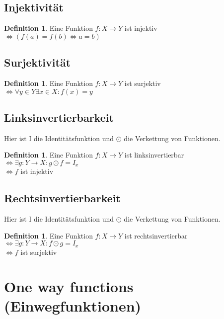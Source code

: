 \documentclass[12pt,a4paper]{article}
\theoremstyle{definition}
\newtheorem{definition}[theorem]{Definition}
\begin{document}
    \subsection{Injektivität}

    \begin{definition}
        Eine Funktion $f: X \longrightarrow Y$ ist injektiv \\
        $\Leftrightarrow (f(a) = f(b) \Leftrightarrow a = b)$
    \end{definition}

    \subsection{Surjektivität}

    \begin{definition}
        Eine Funktion $f: X \longrightarrow Y$ ist surjektiv \\
        $\Leftrightarrow \forall y \in Y \exists x \in X: f(x) = y$
    \end{definition}

    \subsection{Linksinvertierbarkeit}
    Hier ist I die Identitätsfunktion und $\odot$ die Verkettung von Funktionen.
    \begin{definition}
        Eine Funktion $f: X \longrightarrow Y$ ist linksinvertierbar \\
        $\Leftrightarrow \exists g: Y \longrightarrow X: g \odot f = I_x$ \\
        $\Leftrightarrow f$ ist injektiv
    \end{definition}

    \subsection{Rechtsinvertierbarkeit}
    Hier ist I die Identitätsfunktion und $\odot$ die Verkettung von Funktionen.
    \begin{definition}
        Eine Funktion $f: X \longrightarrow Y$ ist rechtsinvertierbar \\
        $\Leftrightarrow \exists g: Y \longrightarrow X: f \odot g = I_x$ \\
        $\Leftrightarrow f$ ist surjektiv
    \end{definition}


    \section{One way functions (Einwegfunktionen)}
\end{document}
